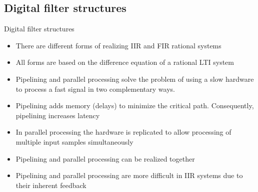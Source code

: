 \documentclass[10pt, aspectratio=169]{beamer}
\begin{document}
\subsection{Digital filter structures}
\begin{frame}{Digital filter structures}
\begin{itemize}
	\item There are different forms of realizing IIR and FIR rational systems
	\item All forms are based on the difference equation of a rational LTI system
	\item Pipelining and parallel processing solve the problem of using a slow hardware to process a fast signal in two complementary ways. 
	\item Pipelining adds memory (delays) to minimize the critical path. Consequently, pipelining increases latency
	\item In parallel processing the hardware is replicated to allow processing of multiple input samples simultaneously
	\item Pipelining and parallel processing can be realized together
	\item Pipelining and parallel processing are more difficult in IIR systems due to their inherent feedback
\end{itemize}
\end{frame}

%
\end{document}
